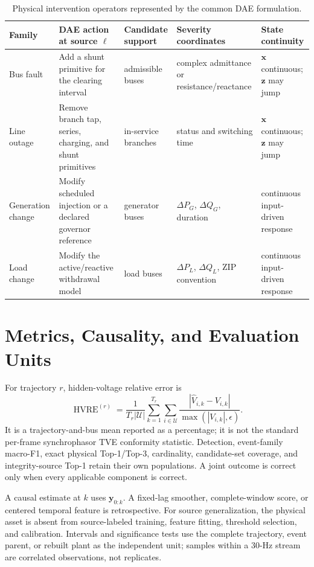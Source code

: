 \documentclass{ieeeaccess}
\begin{document}
\begin{table}[t]
\caption{Physical intervention operators represented by the common DAE formulation.}
\label{tab:supp-physical-operators}
\centering
\scriptsize
\begin{tabularx}{\textwidth}{@{}lXlll@{}}
\toprule
Family & DAE action at source $\ell$ & Candidate support & Severity coordinates & State continuity \\
\midrule
Bus fault & Add a shunt primitive for the clearing interval & admissible buses & complex admittance or resistance/reactance & $\bm x$ continuous; $\bm z$ may jump \\
Line outage & Remove branch tap, series, charging, and shunt primitives & in-service branches & status and switching time & $\bm x$ continuous; $\bm z$ may jump \\
Generation change & Modify scheduled injection or a declared governor reference & generator buses & $\Delta P_G$, $\Delta Q_G$, duration & continuous input-driven response \\
Load change & Modify the active/reactive withdrawal model & load buses & $\Delta P_L$, $\Delta Q_L$, ZIP convention & continuous input-driven response \\
\bottomrule
\end{tabularx}
\end{table}



\section{Metrics, Causality, and Evaluation Units}

For trajectory $r$, hidden-voltage relative error is
\begin{equation}
 \operatorname{HVRE}^{(r)}=\frac{1}{T_r|\mathcal U|}
 \sum_{k=1}^{T_r}\sum_{i\in\mathcal U}
 \frac{|\widehat V_{i,k}-V_{i,k}|}{\max(|V_{i,k}|,\epsilon)}.
 \label{eq:supp-hvre}
\end{equation}
It is a trajectory-and-bus mean reported as a percentage; it is not the standard per-frame synchrophasor TVE conformity statistic. Detection, event-family macro-F1, exact physical Top-1/Top-3, cardinality, candidate-set coverage, and integrity-source Top-1 retain their own populations. A joint outcome is correct only when every applicable component is correct.

A causal estimate at $k$ uses $\bm y_{0:k}$. A fixed-lag smoother, complete-window score, or centered temporal feature is retrospective. For source generalization, the physical asset is absent from source-labeled training, feature fitting, threshold selection, and calibration. Intervals and significance tests use the complete trajectory, event parent, or rebuilt plant as the independent unit; samples within a 30-Hz stream are correlated observations, not replicates.
\end{document}
